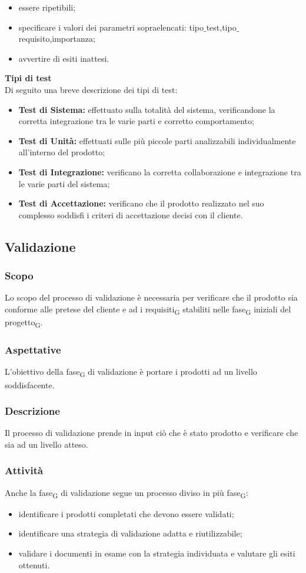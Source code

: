     \begin{itemize}
    	\item essere ripetibili;
    	\item specificare i valori dei parametri sopraelencati: tipo$\_$test,tipo$\_$requisito,importanza;
    	\item avvertire di esiti inattesi.
    \end{itemize}
	\textbf{Tipi di test}\\
	Di seguito una breve descrizione dei tipi di test:
	\begin{itemize}
		\item \textbf{Test di Sistema:} effettuato sulla totalità del sistema, verificandone la corretta integrazione tra le varie parti e corretto comportamento;
		\item \textbf{Test di Unità:} effettuati sulle più piccole parti analizzabili individualmente all'interno del prodotto;
		\item \textbf{Test di Integrazione:} verificano la corretta collaborazione e integrazione tra le varie parti del sistema;
		\item \textbf{Test di Accettazione:} verificano che il prodotto realizzato nel suo complesso soddisfi i criteri di accettazione decisi con il cliente.
	\end{itemize}
\subsection{Validazione}
    \subsubsection{Scopo}
    Lo scopo del processo di validazione è necessaria per verificare che il prodotto sia conforme alle pretese del cliente e ad i requisiti\textsubscript{G} stabiliti nelle fase\textsubscript{G} iniziali del progetto\textsubscript{G}.
    \subsubsection{Aspettative}
    L'obiettivo della fase\textsubscript{G} di validazione è portare i prodotti ad un livello soddisfacente.
    \subsubsection{Descrizione}
    Il processo di validazione prende in input ciò che è stato prodotto e verificare che sia ad un livello atteso.
    \subsubsection{Attività}
    Anche la fase\textsubscript{G} di validazione segue un processo diviso in più fase\textsubscript{G}:
    \begin{itemize}
    	\item identificare i prodotti completati che devono essere validati;
    	\item identificare una strategia di validazione adatta e riutilizzabile;
    	\item validare i documenti in esame con la strategia individuata e valutare gli esiti ottenuti.
    \end{itemize}


